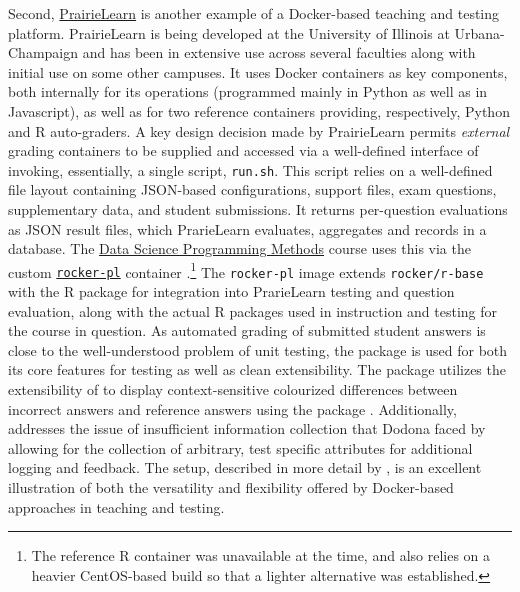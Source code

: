 Second, \href{https://github.com/PrairieLearn}{PrairieLearn} is another
example of a Docker-based teaching and testing platform. PrairieLearn is
being developed at the University of Illinois at Urbana-Champaign
\citep{prairielearn:2018} and has been in extensive use across several
faculties along with initial use on some other campuses. It uses Docker
containers as key components, both internally for its operations
(programmed mainly in Python as well as in Javascript), as well as for
two reference containers providing, respectively, Python and R
auto-graders. A key design decision made by PrairieLearn permits
\emph{external} grading containers to be supplied and accessed via a
well-defined interface of invoking, essentially, a single script,
\texttt{run.sh}. This script relies on a well-defined file layout
containing JSON-based configurations, support files, exam questions,
supplementary data, and student submissions. It returns per-question
evaluations as JSON result files, which PrarieLearn evaluates,
aggregates and records in a database. The
\href{https://stat430.com}{Data Science Programming Methods} course
\citep{stat430:2019} uses this via the custom
\href{https://github.com/stat430dspm/rocker-pl}{\texttt{rocker-pl}}
container
\citep{rocker-pl:2019}.\footnote{The reference R container was unavailable at the time, and also relies on a heavier CentOS-based build so that a lighter alternative was established.}
The \texttt{rocker-pl} image extends \texttt{rocker/r-base} with the
 R package \citep{pkg:plr:2019} for integration into
PrarieLearn testing and question evaluation, along with the actual R
packages used in instruction and testing for the course in question. As
automated grading of submitted student answers is close to the
well-understood problem of unit testing, the  package
\citep{CRAN:tinytest} is used for both its core features for testing as
well as clean extensibility. The package 
\citep{CRAN:ttdo} utilizes the extensibility of  to
display context-sensitive colourized differences between incorrect
answers and reference answers using the  package
\citep{CRAN:diffobj}. Additionally,  addresses the issue
of insufficient information collection that Dodona faced by allowing for
the collection of arbitrary, test specific attributes for additional
logging and feedback. The setup, described in more detail by
\citet{paper:r_autograder}, is an excellent illustration of both the
versatility and flexibility offered by Docker-based approaches in
teaching and testing.

